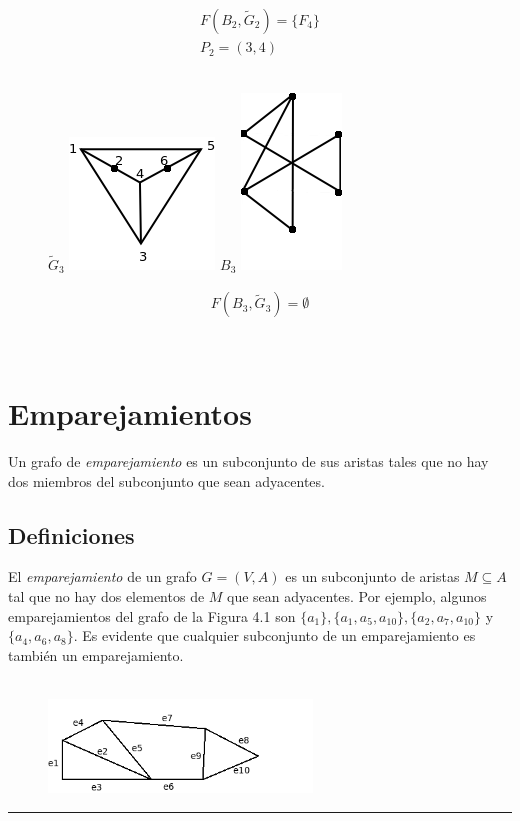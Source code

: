 \documentclass[10pt,a5paper]{book}
\begin{document}
\begin{figure}[H]
\quad \parbox{1cm}{
\begin{align}
F(B_2,\widetilde{G}_2) = \{F_4\}\nonumber\\
P_2 = (3,4)\nonumber
\end{align}}\\
$\widetilde{G}_3$ \includegraphics[scale=.3]{Fig3_21_d1.png}
\quad $B_3$ \includegraphics[scale=.3]{Fig3_21_d2.png}
\quad \parbox{1cm}{
\begin{align}
F(B_3,\widetilde{G}_3) = \emptyset\nonumber
\end{align}}\\
\end{figure}

\chapter{Emparejamientos}
Un grafo de \emph{emparejamiento} es un subconjunto de sus aristas tales que no hay dos miembros del subconjunto que sean adyacentes.

\section{Definiciones}
El \emph{emparejamiento} de un grafo $G = (V,A)$ es un subconjunto de aristas $M \subseteq A$ tal que no hay dos elementos de $M$ que sean adyacentes. Por ejemplo, algunos emparejamientos del grafo de la Figura 4.1 son $\{a_1\}, \{a_1, a_5, a_{10}\}, \{a_2, a_7, a_{10}\}$ y $\{a_4,a_6,a_8\}$. Es evidente que cualquier subconjunto de un emparejamiento es también un emparejamiento.

\begin{figure}[H]
\caption{ }
\hrulefill{}\\
\hspace*{.7in}\includegraphics[width=7cm]{Fig4_1.png}
\end{figure}
\hrule{}
\end{document}
